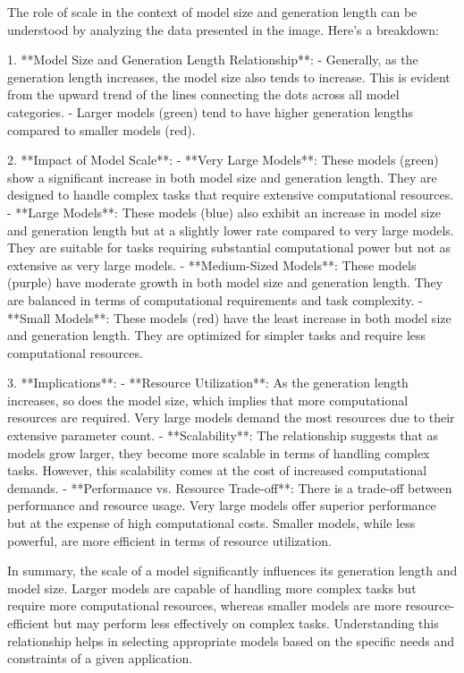 The role of scale in the context of model size and generation length can be understood by analyzing the data presented in the image. Here's a breakdown:

1. **Model Size and Generation Length Relationship**:
   - Generally, as the generation length increases, the model size also tends to increase. This is evident from the upward trend of the lines connecting the dots across all model categories.
   - Larger models (green) tend to have higher generation lengths compared to smaller models (red).

2. **Impact of Model Scale**:
   - **Very Large Models**: These models (green) show a significant increase in both model size and generation length. They are designed to handle complex tasks that require extensive computational resources.
   - **Large Models**: These models (blue) also exhibit an increase in model size and generation length but at a slightly lower rate compared to very large models. They are suitable for tasks requiring substantial computational power but not as extensive as very large models.
   - **Medium-Sized Models**: These models (purple) have moderate growth in both model size and generation length. They are balanced in terms of computational requirements and task complexity.
   - **Small Models**: These models (red) have the least increase in both model size and generation length. They are optimized for simpler tasks and require less computational resources.

3. **Implications**:
   - **Resource Utilization**: As the generation length increases, so does the model size, which implies that more computational resources are required. Very large models demand the most resources due to their extensive parameter count.
   - **Scalability**: The relationship suggests that as models grow larger, they become more scalable in terms of handling complex tasks. However, this scalability comes at the cost of increased computational demands.
   - **Performance vs. Resource Trade-off**: There is a trade-off between performance and resource usage. Very large models offer superior performance but at the expense of high computational costs. Smaller models, while less powerful, are more efficient in terms of resource utilization.

In summary, the scale of a model significantly influences its generation length and model size. Larger models are capable of handling more complex tasks but require more computational resources, whereas smaller models are more resource-efficient but may perform less effectively on complex tasks. Understanding this relationship helps in selecting appropriate models based on the specific needs and constraints of a given application.